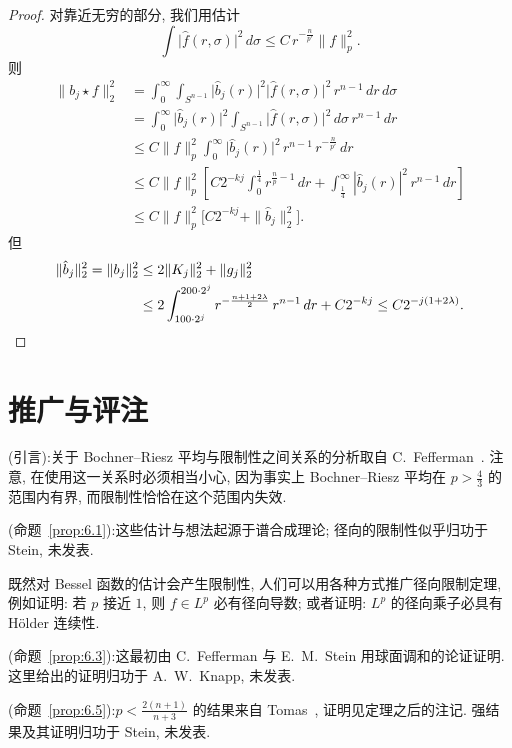 \begin{proof}
对靠近无穷的部分, 我们用估计
\[
\int\bigl|\hat{f}(r,\sigma)\bigr|^{2}\,d\sigma\leq C\,r^{-\frac{n}{p'}}\|f\|_{p}^{2}.
\]
则
\begin{align*}
\|b_{j}\star f\|_{2}^{2}
&=\int_{0}^{\infty}\int_{S^{n-1}}\bigl|\hat{b}_{j}(r)\bigr|^{2}\bigl|\hat{f}(r,\sigma)\bigr|^{2}\,r^{n-1}\,dr\,d\sigma \\
&=\int_{0}^{\infty}\bigl|\hat{b}_{j}(r)\bigr|^{2}\int_{S^{n-1}}\bigl|\hat{f}(r,\sigma)\bigr|^{2}\,d\sigma\,r^{n-1}\,dr \\
&\leq C\|f\|_{p}^{2}\int_{0}^{\infty}\bigl|\hat{b}_{j}(r)\bigr|^{2}\,r^{n-1}\,r^{-\frac{n}{p'}}\,dr \\
&\leq C\|f\|_{p}^{2}\left[C2^{-kj}\int_{0}^{\frac{1}{4}}r^{\frac{n}{p}-1}\,dr+\int_{\frac{1}{4}}^{\infty}|\hat{b}_{j}(r)|^{2}\,r^{n-1}\,dr\right] \\
&\leq C\|f\|_{p}^{2}\bigl[C2^{-kj}+\|\hat{b}_{j}\|_{2}^{2}\bigr].
\end{align*}
但
\begin{align*}
\|\hat{b}_{j}\|_{2}^{2}=\|b_{j}\|_{2}^{2}
&\leq 2\|K_{j}\|_{2}^{2}+\|g_{j}\|_{2}^{2} \\
&\leq 2\int_{100\cdot 2^{j}}^{200\cdot 2^{j}}r^{-\frac{n+1+2\lambda}{2}}\,r^{n-1}\,dr+C2^{-kj}
\leq C2^{-j(1+2\lambda)}. \qedhere
\end{align*}
\end{proof}

\section{推广与评注}
\label{sec:6.3}

\noindent (引言):\quad 关于 Bochner--Riesz 平均与限制性之间关系的分析取自 C.~Fefferman~\cite{fefferman-spherical}. 注意, 在使用这一关系时必须相当小心, 因为事实上 Bochner--Riesz 平均在 $p>\frac{4}{3}$ 的范围内有界, 而限制性恰恰在这个范围内失效.

\noindent (命题~\ref{prop:6.1}):\quad 这些估计与想法起源于谱合成理论; 径向的限制性似乎归功于 Stein, 未发表.

既然对 Bessel 函数的估计会产生限制性, 人们可以用各种方式推广径向限制定理, 例如证明: 若 $p$ 接近 $1$, 则 $f\in L^p$ 必有径向导数; 或者证明: $L^p$ 的径向乘子必具有 H\"older 连续性.

\noindent (命题~\ref{prop:6.3}):\quad 这最初由 C.~Fefferman 与 E.~M.~Stein 用球面调和的论证证明. 这里给出的证明归功于 A.~W.~Knapp, 未发表.

\noindent (命题~\ref{prop:6.5}):\quad $p<\frac{2(n+1)}{n+3}$ 的结果来自 Tomas~\cite{tomas1}, 证明见定理之后的注记. 强结果及其证明归功于 Stein, 未发表.

